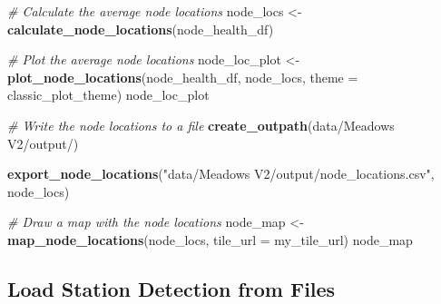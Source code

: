 \documentclass[
]{book}
\newenvironment{Shaded}{\begin{snugshade}}{\end{snugshade}}
\newcommand{\AttributeTok}[1]{\textcolor[rgb]{0.13,0.29,0.53}{#1}}
\newcommand{\CommentTok}[1]{\textcolor[rgb]{0.56,0.35,0.01}{\textit{#1}}}
\newcommand{\FunctionTok}[1]{\textcolor[rgb]{0.13,0.29,0.53}{\textbf{#1}}}
\newcommand{\NormalTok}[1]{#1}
\newcommand{\OtherTok}[1]{\textcolor[rgb]{0.56,0.35,0.01}{#1}}
\newcommand{\StringTok}[1]{\textcolor[rgb]{0.31,0.60,0.02}{#1}}
\begin{document}
\begin{Shaded}
\begin{Highlighting}[]
\CommentTok{\# Calculate the average node locations}
\NormalTok{node\_locs }\OtherTok{\textless{}{-}} \FunctionTok{calculate\_node\_locations}\NormalTok{(node\_health\_df)}

\CommentTok{\# Plot the average node locations}
\NormalTok{node\_loc\_plot }\OtherTok{\textless{}{-}} \FunctionTok{plot\_node\_locations}\NormalTok{(node\_health\_df, }
\NormalTok{                                     node\_locs,}
                                     \AttributeTok{theme =}\NormalTok{ classic\_plot\_theme)}
\NormalTok{node\_loc\_plot}

\CommentTok{\# Write the node locations to a file}
\FunctionTok{create\_outpath}\NormalTok{(}\StringTok{\textquotesingle{}data/Meadows V2/output/\textquotesingle{}}\NormalTok{)}

\FunctionTok{export\_node\_locations}\NormalTok{(}\StringTok{"data/Meadows V2/output/node\_locations.csv"}\NormalTok{, }
\NormalTok{                      node\_locs)}

\CommentTok{\# Draw a map with the node locations}
\NormalTok{node\_map }\OtherTok{\textless{}{-}} \FunctionTok{map\_node\_locations}\NormalTok{(node\_locs, }
                               \AttributeTok{tile\_url =}\NormalTok{ my\_tile\_url)}
\NormalTok{node\_map}
\end{Highlighting}
\end{Shaded}

\subsection{Load Station Detection from Files}\label{load-station-detection-from-files}
\end{document}
